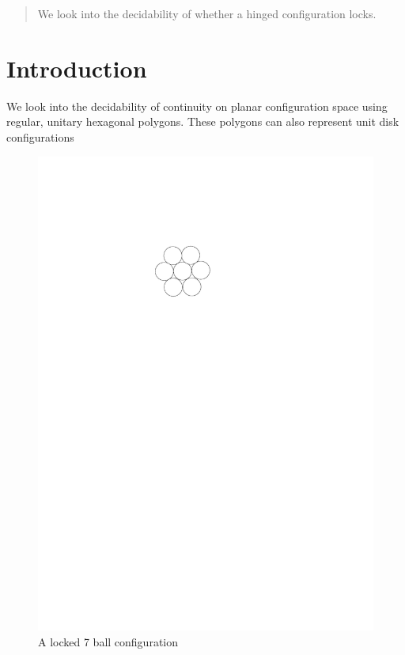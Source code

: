 \begin{abstract}
We look into the decidability of whether a hinged configuration locks.
\end{abstract}
\section{Introduction}
We look into the decidability of continuity on planar configuration space using regular, unitary hexagonal polygons.  These polygons can also represent unit disk configurations \cite{Breu19983} 
\begin{figure}[ht]
\begin{center}
\includegraphics{graphics/7ballLocked.pdf}
\caption{A locked 7 ball configuration}
\label{figure:7ballLocked}
\end{center} 
\end{figure}
